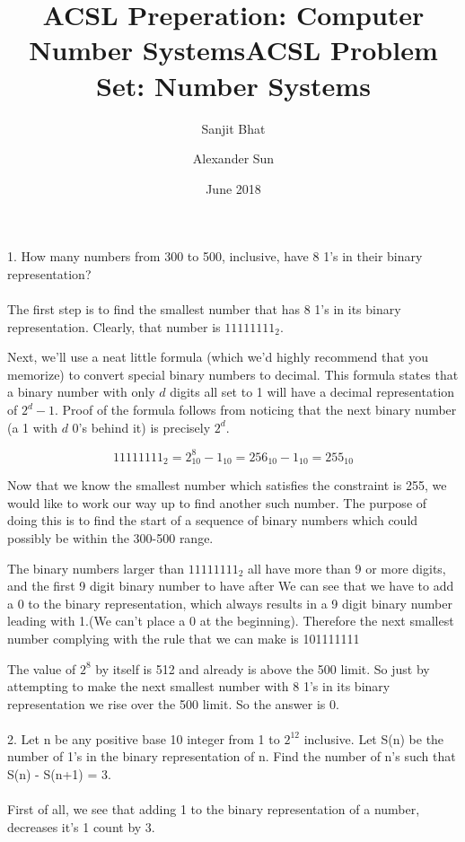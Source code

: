 \documentclass{article}
\title{ACSL Preperation: Computer Number Systems}
\author{Sanjit Bhat \and Alexander Sun}
\date{June 2018}
\begin{document}
\maketitle
\newpage

\begin{center}
    \title{ACSL Problem Set: Number Systems}
\end{center}
1. How many numbers from 300 to 500, inclusive, have 8 1’s in their binary representation?
\\\\
\indent
The first step is to find the smallest number that has 8 1's in its binary representation. Clearly, that number is $11111111_2$. 

Next, we'll use a neat little formula (which we'd highly recommend that you memorize) to convert special binary numbers to decimal. This formula states that a binary number with only $d$ digits all set to 1 will have a decimal representation of $2^d-1$. Proof of the formula follows from noticing that the next binary number (a 1 with $d$ 0's behind it) is precisely $2^d$.

\[11111111_2 = 2^8_{10}-1_{10} = 256_{10}-1_{10} = 255_{10}\]

Now that we know the smallest number which satisfies the constraint is 255, we would like to work our way up to find another such number. The purpose of doing this is to find the start of a sequence of binary numbers which could possibly be within the 300-500 range.

The binary numbers larger than $11111111_2$ all have more than 9 or more digits, and the first 9 digit binary number to have after We can see that we have to add a 0 to the binary representation, which always results in a 9 digit binary number leading with 1.(We can't place a 0 at the beginning). Therefore the next smallest number complying with the rule that we can make is 101111111 

The value of $2^8$ by itself is 512 and already is above the 500 limit. So just by attempting to make the next smallest number with 8 1's in its binary representation we rise over the 500 limit. So the answer is 0.
\\\\
2. Let n be any positive base 10 integer from 1 to $2^{12}$ inclusive. Let S(n) be the number of 1’s in the binary representation of n. Find the number of n’s such that S(n) - S(n+1) = 3.
\\\\
\indent
First of all, we see that adding 1 to the binary representation of a number, decreases it's 1 count by 3. 
\end{document}
